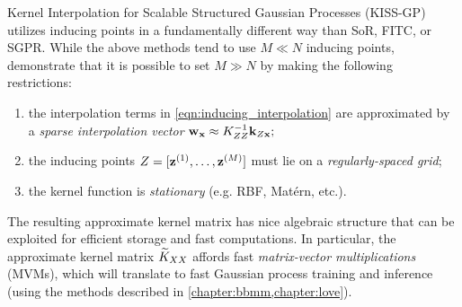 Kernel Interpolation for Scalable Structured Gaussian Processes (KISS-GP) \cite{wilson2015kernel} utilizes inducing points in a fundamentally different way than SoR, FITC, or SGPR.
While the above methods tend to use $M \ll N$ inducing points, \citet{wilson2015kernel} demonstrate that it is possible to set $M \gg N$ by making the following restrictions:
\begin{enumerate}
  \item the interpolation terms in \cref{eqn:inducing_interpolation} are approximated by a \emph{sparse interpolation vector} $\mathbf{w}_{\mathbf{x}} \approx K^{-1}_{ZZ} \mathbf{k}_{Z\mathbf{x}};$
  \item the inducing points $Z = [\mathbf{z}^{(1)}, \ldots, \mathbf{z}^{(M)}]$ must lie on a \emph{regularly-spaced grid};
  \item the kernel function is \emph{stationary} (e.g. RBF, Mat\'ern, etc.).
\end{enumerate}
%
\noindent
The resulting approximate kernel matrix has nice algebraic structure that can be exploited for efficient storage and fast computations.
In particular, the approximate kernel matrix $\widetilde {K}_{XX}$ affords fast \emph{matrix-vector multiplications} (MVMs), which will translate to fast Gaussian process training and inference (using the methods described in \cref{chapter:bbmm,chapter:love}).

